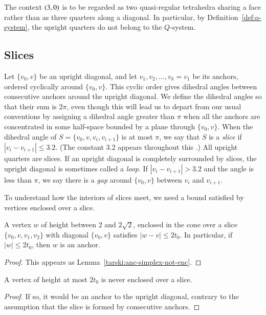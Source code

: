 The context $\relax(3,0)$ is to be regarded as two
quasi-regular tetrahedra sharing a face rather than as three
quarters along a diagonal.  In particular, by
Definition~\ref{def:q-system}, the upright quarters do not belong
to the $Q$-system.

\subsection{Slices} %
    \label{sec:slice}  %

Let $\{v_0,v\}$ be an upright diagonal, and let
$v_1,v_2,\ldots,v_k=v_1$ be its anchors, ordered cyclically around
$\{v_0,v\}$.  This cyclic order gives dihedral angles between
consecutive anchors around the upright diagonal. We define the
dihedral angles so that their sum is $2\pi$, even though this will
lead us to depart from our usual conventions by assigning a
dihedral angle greater than $\pi$ when all the anchors are
concentrated in some half-space bounded by a plane through
$\{v_0,v\}$. When the dihedral angle of $S=\{v_0,v,v_i,v_{i+1}\}$ is at
most $\pi$, we say that $S$ is a {\it slice\/} if
$|v_i-v_{i+1}|\le3.2$. (The constant $3.2$ appears throughout this
\chap.) All upright quarters are slices. If an upright
diagonal is completely surrounded by slices, the
upright diagonal is sometimes called a {\it loop}. If
$|v_i-v_{i+1}|>3.2$ and the angle is less than $\pi$, we say there
is a {\it gap\/} around $\{v_0,v\}$ between $v_i$ and $v_{i+1}$.

To understand how the interiors of slices meet, we
need a bound satisfied by vertices enclosed over a slice.


\begin{lemma}
    \label{lemma:anc-simplex-not-enc}
A vertex $w$ of height between 2 and $2\sqrt{2}$, enclosed in the cone
over a slice $\{v_0,v,v_1,v_2\}$ with diagonal $\{v_0,v\}$ satisfies
$|w-v|\le 2t_0$. In particular, if $|w|\le 2t_0$, then $w$ is an anchor.
\end{lemma}

\begin{proof}
This appears as Lemma~\ref{tarski:anc-simplex-not-enc}.
\end{proof}


\begin{corollary}
A vertex of height at most $2t_0$ is never enclosed over a slice.
\end{corollary}

\begin{proof}  If so, it would be an anchor to the upright diagonal, contrary to
the assumption that the slice is formed by consecutive
anchors.
\end{proof}



